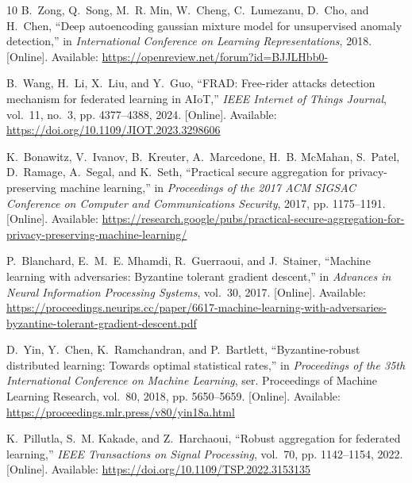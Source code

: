 \documentclass[conference]{IEEEtran}
\begin{document}
\begin{thebibliography}{10}
\BIBentryALTinterwordspacing
B.~Zong, Q.~Song, M.~R. Min, W.~Cheng, C.~Lumezanu, D.~Cho, and H.~Chen, ``Deep
  autoencoding gaussian mixture model for unsupervised anomaly detection,'' in
  \emph{International Conference on Learning Representations}, 2018. [Online].
  Available: \url{https://openreview.net/forum?id=BJJLHbb0-}
\BIBentrySTDinterwordspacing

\BIBentryALTinterwordspacing
B.~Wang, H.~Li, X.~Liu, and Y.~Guo, ``{FRAD}: Free-rider attacks detection
  mechanism for federated learning in {AIoT},'' \emph{IEEE Internet of Things
  Journal}, vol.~11, no.~3, pp. 4377--4388, 2024. [Online]. Available:
  \url{https://doi.org/10.1109/JIOT.2023.3298606}
\BIBentrySTDinterwordspacing

\BIBentryALTinterwordspacing
K.~Bonawitz, V.~Ivanov, B.~Kreuter, A.~Marcedone, H.~B. McMahan, S.~Patel,
  D.~Ramage, A.~Segal, and K.~Seth, ``Practical secure aggregation for
  privacy-preserving machine learning,'' in \emph{Proceedings of the 2017 ACM
  SIGSAC Conference on Computer and Communications Security}, 2017, pp.
  1175--1191. [Online]. Available:
  \url{https://research.google/pubs/practical-secure-aggregation-for-privacy-preserving-machine-learning/}
\BIBentrySTDinterwordspacing

\BIBentryALTinterwordspacing
P.~Blanchard, E.~M.~E. Mhamdi, R.~Guerraoui, and J.~Stainer, ``Machine learning
  with adversaries: Byzantine tolerant gradient descent,'' in \emph{Advances in
  Neural Information Processing Systems}, vol.~30, 2017. [Online]. Available:
  \url{https://proceedings.neurips.cc/paper/6617-machine-learning-with-adversaries-byzantine-tolerant-gradient-descent.pdf}
\BIBentrySTDinterwordspacing

\BIBentryALTinterwordspacing
D.~Yin, Y.~Chen, K.~Ramchandran, and P.~Bartlett, ``Byzantine-robust
  distributed learning: Towards optimal statistical rates,'' in
  \emph{Proceedings of the 35th International Conference on Machine Learning},
  ser. Proceedings of Machine Learning Research, vol.~80, 2018, pp. 5650--5659.
  [Online]. Available: \url{https://proceedings.mlr.press/v80/yin18a.html}
\BIBentrySTDinterwordspacing

\BIBentryALTinterwordspacing
K.~Pillutla, S.~M. Kakade, and Z.~Harchaoui, ``Robust aggregation for federated
  learning,'' \emph{IEEE Transactions on Signal Processing}, vol.~70, pp.
  1142--1154, 2022. [Online]. Available:
  \url{https://doi.org/10.1109/TSP.2022.3153135}
\BIBentrySTDinterwordspacing


\end{thebibliography}
\end{document}
